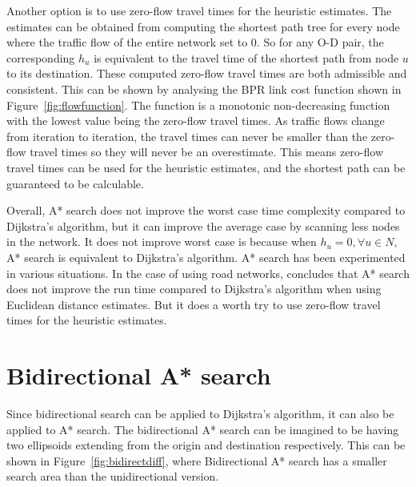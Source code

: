 Another option is to use zero-flow travel times for the heuristic estimates.
The estimates can be obtained from computing the shortest path tree for every node where the traffic flow of the entire network set to 0.
So for any O-D pair, the corresponding $h_u$ is equivalent to the travel time of the shortest path from node $u$ to its destination.
These computed zero-flow travel times are both admissible and consistent.
This can be shown by analysing the BPR link cost function shown in Figure~\ref{fig:flowfunction}.
The function is a monotonic non-decreasing function with the lowest value being the zero-flow travel times.
As traffic flows change from iteration to iteration,
the travel times can never be smaller than the zero-flow travel times so they will never be an overestimate.
This means zero-flow travel times can be used for the heuristic estimates, and the shortest path can be guaranteed to be calculable.

Overall, A* search does not improve the worst case time complexity compared to Dijkstra's algorithm,
but it can improve the average case by scanning less nodes in the network.
It does not improve worst case is because when $h_u = 0, \forall u \in N$, A* search is equivalent to Dijkstra's algorithm.
A* search has been experimented in various situations.
In the case of using road networks,
\citet{GoldbergLandmarks} concludes that A* search does not improve the run time compared to Dijkstra's algorithm when using Euclidean distance estimates.
But it does a worth try to use zero-flow travel times for the heuristic estimates.

\section{Bidirectional A* search}
Since bidirectional search can be applied to Dijkstra's algorithm,
it can also be applied to A* search.
The bidirectional A* search can be imagined to be having two ellipsoids extending from the origin and destination respectively.
This can be shown in Figure~\ref{fig:bidirectdiff},
where Bidirectional A* search has a smaller search area than the unidirectional version.

